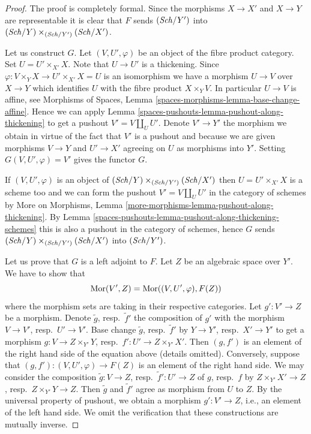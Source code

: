 \begin{proof}
The proof is completely formal.
Since the morphisms $X \to X'$ and $X \to Y$ are representable it
is clear that $F$ sends $(\mathit{Sch}/Y')$ into
$(\mathit{Sch}/Y) \times_{(\mathit{Sch}/Y')} (\mathit{Sch}/X')$.

\medskip\noindent
Let us construct $G$. Let $(V, U', \varphi)$ be an object of the fibre
product category. Set $U = U' \times_{X'} X$. Note that $U \to U'$ is a
thickening. Since $\varphi : V \times_Y X \to U' \times_{X'} X = U$ is an
isomorphism we have a morphism $U \to V$ over $X \to Y$ which identifies
$U$ with the fibre product $X \times_Y V$. In particular $U \to V$ is
affine, see
Morphisms of Spaces, Lemma \ref{spaces-morphisms-lemma-base-change-affine}.
Hence we can apply Lemma \ref{spaces-pushouts-lemma-pushout-along-thickening}
to get a pushout $V' = V \amalg_U U'$. Denote $V' \to Y'$ the morphism
we obtain in virtue of the fact that $V'$ is a pushout and because
we are given morphisms $V \to Y$ and $U' \to X'$ agreeing on $U$
as morphisms into $Y'$. Setting $G(V, U', \varphi) = V'$
gives the functor $G$.

\medskip\noindent
If $(V, U', \varphi)$ is an object of $(\mathit{Sch}/Y) \times_{(\mathit{Sch}/Y')} (\mathit{Sch}/X')$
then $U = U' \times_{X'} X$ is a scheme too and we can form the pushout
$V' = V \amalg_U U'$ in the category of schemes by
More on Morphisms, Lemma \ref{more-morphisms-lemma-pushout-along-thickening}.
By Lemma \ref{spaces-pushouts-lemma-pushout-along-thickening-schemes}
this is also a pushout in the category of schemes, hence
$G$ sends $(\mathit{Sch}/Y) \times_{(\mathit{Sch}/Y')} (\mathit{Sch}/X')$ into $(\mathit{Sch}/Y')$.

\medskip\noindent
Let us prove that $G$ is a left adjoint to $F$. Let $Z$ be an algebraic space
over $Y'$. We have to show that
$$
\operatorname{Mor}(V', Z) = \operatorname{Mor}((V, U', \varphi), F(Z))
$$
where the morphism sets are taking in their respective categories.
Let $g' : V' \to Z$ be a morphism. Denote $\tilde g$, resp.\ $\tilde f'$
the composition of $g'$ with the morphism $V \to V'$, resp.\ $U' \to V'$.
Base change $\tilde g$, resp.\ $\tilde f'$ by $Y \to Y'$, resp.\ $X' \to Y'$
to get a morphism $g : V \to Z \times_{Y'} Y$,
resp.\ $f' : U' \to Z \times_{Y'} X'$. Then $(g, f')$ is an element
of the right hand side of the equation above (details omitted).
Conversely, suppose that $(g, f') : (V, U', \varphi) \to F(Z)$ is an
element of the right hand side.
We may consider the composition $\tilde g : V \to Z$,
resp.\ $\tilde f' : U' \to Z$ of $g$, resp.\ $f$ by
$Z \times_{Y'} X' \to Z$, resp.\ $Z \times_{Y'} Y \to Z$.
Then $\tilde g$ and $\tilde f'$ agree as morphism from $U$ to $Z$.
By the universal property of pushout, we obtain a morphism
$g' : V' \to Z$, i.e., an element of the left hand side.
We omit the verification that these constructions are mutually inverse.
\end{proof}

